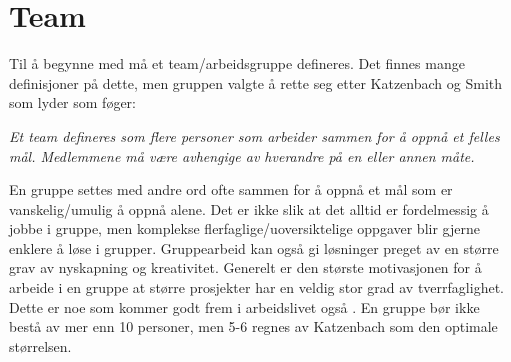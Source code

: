 \section{Team}
Til å begynne med må et team/arbeidsgruppe defineres. 
Det finnes mange definisjoner på dette, men gruppen valgte å rette seg etter Katzenbach og Smith som lyder som føger: 

\begin{center}
\textit{Et team defineres som flere personer som arbeider sammen for å oppnå et felles mål. \newline
Medlemmene må være avhengige av hverandre på en eller annen måte.}
\newline 
\citep{katzenbach}
\end{center}

En gruppe settes med andre ord ofte sammen for å oppnå et mål som er vanskelig/umulig å oppnå alene. 
Det er ikke slik at det alltid er fordelmessig å jobbe i gruppe, men komplekse flerfaglige/uoversiktelige oppgaver blir gjerne enklere å løse i grupper.
Gruppearbeid kan også gi løsninger preget av en større grav av nyskapning og kreativitet. 
Generelt er den største motivasjonen for å arbeide i en gruppe at større prosjekter har en veldig stor grad av tverrfaglighet. 
Dette er noe som kommer godt frem i arbeidslivet også \citep{levin}. 
En gruppe bør ikke bestå av mer enn 10 personer, men 5-6 regnes av Katzenbach som den optimale størrelsen.
